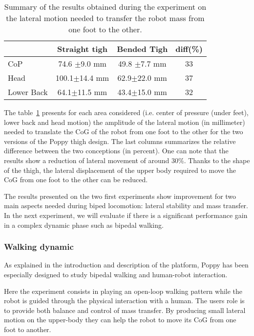 \begin{table}[h]
\centering
\begin{tabular}{|l|c|c|c|}
  \hline &      Straight tigh &                     Bended Tigh &                   diff(\%) \\
  \hline CoP & 74.6 {\scriptsize$\pm$9.0} mm &     49.8 {\scriptsize$\pm$7.7} mm & 33\\
  Head & 100.1{\scriptsize$\pm$14.4} mm&     62.9{\scriptsize$\pm$22.0} mm &  37\\
  Lower Back & 64.1{\scriptsize$\pm$11.5} mm&      43.4{\scriptsize$\pm$15.0} mm &  32 \\
  \hline
\end{tabular}
\caption{Summary of the results obtained during the experiment on the lateral motion needed to transfer the robot mass from one foot to the other.}
\label{tab:CoG_motion}
\end{table}

The table~\ref{tab:CoG_motion} presents for each area considered (i.e. center of pressure (under feet), lower back and head motion) the amplitude of the lateral motion (in millimeter) needed to translate the CoG of the robot from one foot to the other for the two versions of the Poppy thigh design. The last columns summarizes the relative difference between the two conceptions (in percent). One can note that the results show a reduction of lateral movement of around 30\%. Thanks to the shape of the thigh, the lateral displacement of the upper body required to move the CoG from one foot to the other can be reduced.


The results presented on the two first experiments show improvement for two main aspects needed during biped locomotion: lateral stability and mass transfer. In the next experiment, we will evaluate if there is a significant performance gain in a complex dynamic phase such as bipedal walking.


\subsubsection{Walking dynamic} %
\label{sub:walking_dynamic}

As explained in the introduction and description of the platform, Poppy has been especially designed to study bipedal walking and human-robot interaction.

Here the experiment consists in playing an open-loop walking pattern while the robot is guided through the physical interaction with a human. The users role is to provide both balance and control of mass transfer. By producing small lateral motion on the upper-body they can help the robot to move its CoG from one foot to another.

